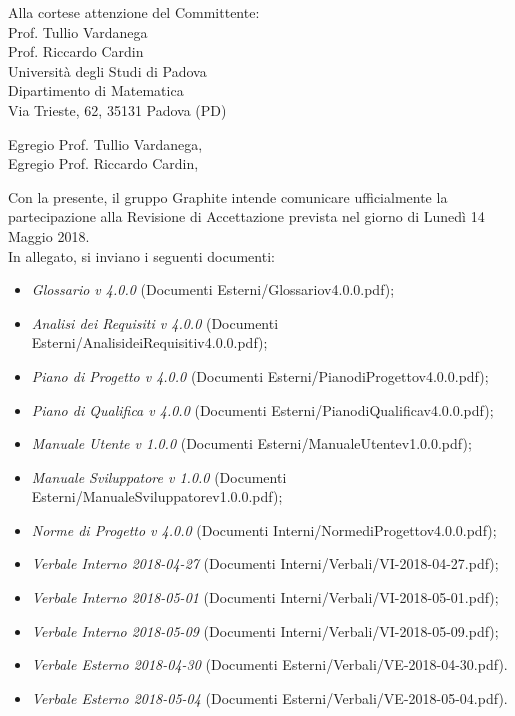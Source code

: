 \documentclass[]{letter}
\begin{document}
\begin{letter}{
		Alla cortese attenzione del Committente: \\
		Prof. Tullio Vardanega \\
		Prof. Riccardo Cardin \\
		Università degli Studi di Padova \\
		Dipartimento di Matematica \\ 
		Via Trieste, 62, 35131 Padova (PD)
	}

\opening{Egregio Prof. Tullio Vardanega, \\ Egregio Prof. Riccardo Cardin,}

\noindent Con la presente, il gruppo Graphite intende comunicare ufficialmente la partecipazione alla Revisione di Accettazione prevista nel giorno di Lunedì 14 Maggio 2018.\\
In allegato, si inviano i seguenti documenti:

\begin{itemize}
	\item \textit{Glossario v 4.0.0} (Documenti Esterni/Glossariov4.0.0.pdf);
	\item \textit{Analisi dei Requisiti v 4.0.0} (Documenti Esterni/AnalisideiRequisitiv4.0.0.pdf);
	\item \textit{Piano di Progetto v 4.0.0} (Documenti Esterni/PianodiProgettov4.0.0.pdf);
	\item \textit{Piano di Qualifica v 4.0.0} (Documenti Esterni/PianodiQualificav4.0.0.pdf);
	\item \textit{Manuale Utente v 1.0.0} (Documenti Esterni/ManualeUtentev1.0.0.pdf);
	\item \textit{Manuale Sviluppatore v 1.0.0} (Documenti Esterni/ManualeSviluppatorev1.0.0.pdf);

	\item \textit{Norme di Progetto v 4.0.0} (Documenti Interni/NormediProgettov4.0.0.pdf);
	
	
	\item \textit{Verbale Interno 2018-04-27} (Documenti Interni/Verbali/VI-2018-04-27.pdf);
	\item \textit{Verbale Interno 2018-05-01} (Documenti Interni/Verbali/VI-2018-05-01.pdf);
	\item \textit{Verbale Interno 2018-05-09} (Documenti Interni/Verbali/VI-2018-05-09.pdf);
	
	\item \textit{Verbale Esterno 2018-04-30} (Documenti Esterni/Verbali/VE-2018-04-30.pdf).
	\item \textit{Verbale Esterno 2018-05-04} (Documenti Esterni/Verbali/VE-2018-05-04.pdf).
\end{itemize}



\end{letter}
\end{document}
